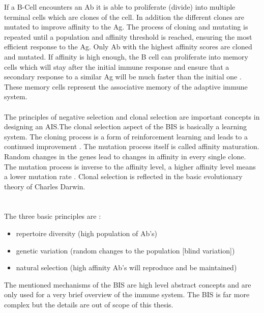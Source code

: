 If a B-Cell encounters an Ab it is able to proliferate (divide) into multiple terminal cells which are clones of the cell. In addition the different clones are mutated to improve affinity to the Ag. The process of cloning and mutating is repeated until a population and affinity threshold is reached, ensuring the most efficient response to the Ag. Only Ab with the highest affinity scores are cloned and mutated. If affinity is high enough, the B cell can proliferate into memory cells which will stay after the initial immune response and ensure that a secondary response to a similar Ag will be much faster than the initial one \cite{DEC02}. These memory cells represent the associative memory of the adaptive immune system. 
\\\\
 The principles of negative selection and clonal selection are important concepts in designing an AIS.The clonal selection aspect of the BIS is basically a learning system. The cloning process is a form of reinforcement learning and leads to a continued improvement \cite{DEC02}.
The mutation process itself is called affinity maturation. Random changes in the genes lead to changes in affinity in every single clone. The mutation process is inverse to the affinity level,  a higher affinity level means a lower mutation rate \cite{DEC02}.  
Clonal selection is reflected in the basic evolutionary theory of Charles Darwin.\\\\\\ The three basic principles are \cite{DEC02}:
\\
\begin{itemize}
	\item 	repertoire diversity (high population of Ab's)
	\item 	genetic variation (random changes to the population [blind variation])
	\item 	natural selection (high affinity Ab's will reproduce and be maintained) 
	
\end{itemize}

The mentioned mechanisms of the BIS are high level abstract concepts and are only used for a very brief overview of the immune system. The BIS is far more complex but the details are out of scope of this thesis.



